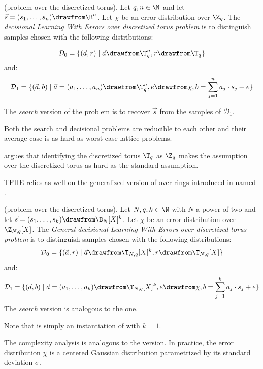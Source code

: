 \begin{definition}
    (\LWE problem over the discretized torus). Let $q, n \in \N$ and let $\vec s = (s_1, \dots, s_n) \drawfrom \B^n$. Let $\chi$ be an error distribution over $\Z_q$. The \emph{decisional Learning With Errors over discretized torus problem} is to distinguish samples chosen with the following distributions:
    
         \[\mathcal{D}_0 = \{(\vec a, r)\mid\vec a \drawfrom \T_q^n, r \drawfrom \T_q\}\]
    and:
         \[\mathcal{D}_1 = \{(\vec a, b)\mid\vec a = (a_1, \dots, a_n) \drawfrom \T_q^n, e \drawfrom \chi, b = \sum_{j=1}^n a_j \cdot s_j + e\}\]
    
    The \emph{search} version of the problem is to recover $\vec s$ from the samples of $\mathcal{D}_1$. 
    \label{def:LWE}
    \end{definition}


Both the search and decisional problems are reducible to each other \cite{Regev-LWE} and their average case is as hard as worst-case lattice problems.

\cite{TCHES:Joye22} argues that identifying the discretized torus $\T_q$ as $\Z_q$ makes the \LWE assumption over the discretized torus as hard as the standard \LWE assumption.


TFHE relies as well on the generalized version of \LWE over rings introduced in \cite{ITCS:BraGenVai12} named \GLWE.

\begin{definition}
    (\GLWE problem over the discretized torus). Let $N, q, k \in \N$ with $N$ a power of two and let $\vec s = (s_1, \dots, s_k) \drawfrom \B_N[X]^k$. Let $\chi$ be an error distribution over $\Z_{N, q}[X]$. The \emph{General decisional Learning With Errors over discretized torus problem} is to distinguish samples chosen with the following distributions:
        \[\mathcal{D}_0 = \{(\vec a, r) \mid \vec a \drawfrom \T_{N, q}[X]^k, r \drawfrom \T_{N, q}[X]\}\]
    and:
        \[\mathcal{D}_1 = \{(\vec a, b) \mid \vec a = (a_1, \dots, a_k) \drawfrom \T_{N, q}[X]^k, e \drawfrom \chi, b = \sum_{j=1}^k a_j \cdot s_j + e\}\]
    \label{def:GLWE}
    The \emph{search} version is analogous to the \LWE one.
\end{definition}
Note that \RLWE is simply an instantiation of \GLWE with $k = 1$.

The complexity analysis is analogous to the \LWE version.
In practice, the error distribution $\chi$ is a centered Gaussian distribution parametrized by its standard deviation $\sigma$.


